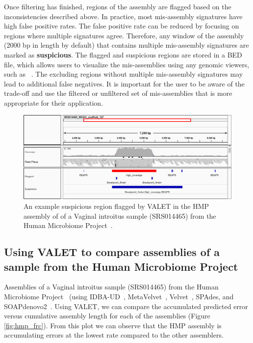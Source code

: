 \documentclass{bioinfo}
\begin{document}
Once filtering has finished, regions of the assembly are flagged based on the inconsistencies described above.
In practice, most mis-assembly signatures have high false positive rates.
The false positive rate can be reduced by focusing on regions where multiple signatures agree.  
Therefore, any window of the assembly (2000 bp in length by default) that contains multiple mis-assembly signatures are marked as \textbf{suspicious}.
The flagged and suspicious regions are stored in a \textsc{BED} file, which allows users to visualize the mis-assemblies using any genomic viewers, such as ~\citep{thorvaldsdottir2012integrative}.
The excluding regions without multiple mis-assembly signatures may lead to additional false negatives. It is important for the user to be aware of the trade-off and use the filtered or unfiltered set of mis-assemblies that is more appropriate for their application.


\begin{figure}[tb!]
\begin{center}
\includegraphics[width=.75\textwidth]{figures/hmp_plasmid}
\end{center}
\caption[hmp_plasmid]{An example suspicious region flagged by VALET in the HMP assembly of of a Vaginal introitus sample (SRS014465) from the Human Microbiome Project~\citep{human2012structure}.}
\label{fig:hmp_plasmid}
\end{figure}


\subsection{Using VALET to compare assemblies of a sample from the Human Microbiome Project}

Assemblies of a Vaginal introitus sample (SRS014465) from the Human Microbiome Project~\citep{human2012structure} (using IDBA-UD~\citep{peng2012idba}, MetaVelvet~\citep{namiki2012metavelvet}, Velvet~\citep{zerbino2008velvet}, SPAdes\citep{bankevich2012spades}, and SOAPdenovo2~\citep{luo2012soapdenovo2}.
Using VALET, we can compare the accumulated predicted error versus cumulative assembly length for each of the assemblies (Figure \ref{fig:hmp_frc}).
From this plot we can observe that the HMP assembly is accumulating errors at the lowest rate compared to the other assemblers.
\end{document}
